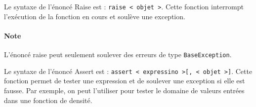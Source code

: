 \documentclass[10pt, french]{article}
\begin{document}
\begin{multicols*}{2}
\begin{definitionNOHFILL}[Raise]
Le syntaxe de l'énoncé Raise est : \texttt{raise < objet >}. Cette fonction interrompt l'exécution de la fonction en cours et soulève une exception.

\paragraph{Note}	L'énoncé raise peut seulement soulever des erreurs de type \texttt{BaseException}.
\end{definitionNOHFILL}

\begin{definitionNOHFILL}[Assert]
Le syntaxe de l'énoncé Assert est : \texttt{assert < expressino >[, < objet >]}. Cette fonction permet de tester une expression et de soulever une exception si elle est fausse. Par exemple, on peut l'utiliser pour tester le domaine de valeurs entrées dans une fonction de densité.
\end{definitionNOHFILL}



\end{multicols*}
\end{document}
